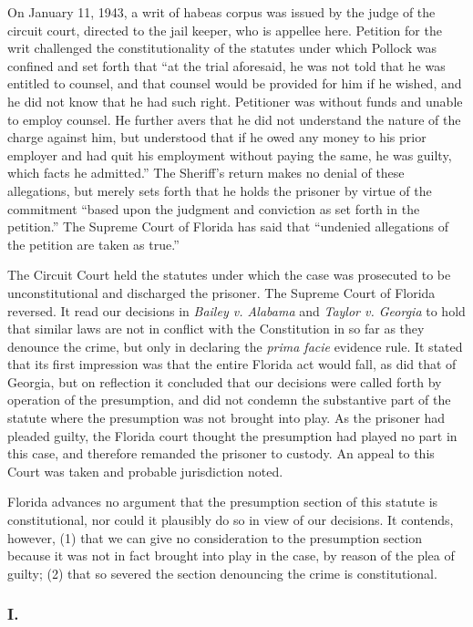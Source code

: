 \documentclass[
  letterpaper,
  11pt,
  DIV=9,
  openright]{scrbook}
\begin{document}
On January 11, 1943, a writ of habeas corpus was issued by the judge of
the circuit court, directed to the jail keeper, who is appellee here.
Petition for the writ challenged the constitutionality of the statutes
under which Pollock was confined and set forth that ``at the trial
aforesaid, he was not told that he was entitled to counsel, and that
counsel would be provided for him if he wished, and he did not know that
he had such right. Petitioner was without funds and unable to employ
counsel. He further avers that he did not understand the nature of the
charge against him, but understood that if he owed any money to his
prior employer and had quit his employment without paying the same, he
was guilty, which facts he admitted.'' The Sheriff's return makes no
denial of these allegations, but merely sets forth that he holds the
prisoner by virtue of the commitment ``based upon the judgment and
conviction as set forth in the petition.'' The Supreme Court of Florida
has said that ``undenied allegations of the petition are taken as
true.''

The Circuit Court held the statutes under which the case was prosecuted
to be unconstitutional and discharged the prisoner. The Supreme Court of
Florida reversed. It read our decisions in \emph{Bailey v. Alabama} and
\emph{Taylor v. Georgia} to hold that similar laws are not in conflict
with the Constitution in so far as they denounce the crime, but only in
declaring the \emph{prima facie} evidence rule. It stated that its first
impression was that the entire Florida act would fall, as did that of
Georgia, but on reflection it concluded that our decisions were called
forth by operation of the presumption, and did not condemn the
substantive part of the statute where the presumption was not brought
into play. As the prisoner had pleaded guilty, the Florida court thought
the presumption had played no part in this case, and therefore remanded
the prisoner to custody. An appeal to this Court was taken and probable
jurisdiction noted.

Florida advances no argument that the presumption section of this
statute is constitutional, nor could it plausibly do so in view of our
decisions. It contends, however, (1) that we can give no consideration
to the presumption section because it was not in fact brought into play
in the case, by reason of the plea of guilty; (2) that so severed the
section denouncing the crime is constitutional.

\subsubsection{I.}\label{i.}
\end{document}
